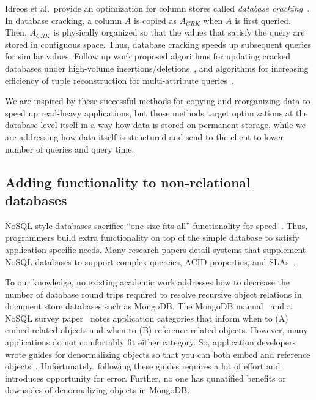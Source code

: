 Idreos et al.~provide an optimization for column stores called {\em database cracking}~\cite{Pirk2007}.
In database cracking, a column $A$ is copied as $A_{CRK}$ when $A$ is first queried.
Then, $A_{CRK}$ is physically organized so that the values that satisfy the query are stored in contiguous space.
Thus, database cracking speeds up subsequent queries for similar values.
Follow up work proposed algorithms for updating cracked databases under high-volume insertions/deletions~\cite{Idreos2007}, and algorithms for increasing efficiency of tuple reconstruction for multi-attribute queries~\cite{Idreos2009}.

We are inspired by these successful methods for copying and reorganizing data to speed up read-heavy applications, but those methods target optimizations at the database level itself in a way how data is stored on permanent storage, while we are addressing how data itself is structured and send to the client to lower number of queries and query time.

\subsection{Adding functionality to non-relational databases} 

NoSQL-style databases sacrifice ``one-size-fits-all'' functionality for speed~\cite{Strauch}.
Thus, programmers build extra functionality on top of the simple database to satisfy application-specific needs.
Many research papers detail systems that supplement NoSQL databases to support complex quereies, ACID properties, and SLAs~\cite{Decandia2007,Chang,Beaver2010,Baker}. 

To our knowledge, no existing academic work addresses how to decrease the number of database round trips required to resolve recursive object relations in document store databases such as MongoDB.
The MongoDB manual~\cite{MongoDB2014} and a NoSQL survey paper~\cite{Strauch} notes application categories that inform when to (A) embed related objects and when to (B) reference related objects.
However, many applications do not comfortably fit either category.
So, application developers wrote guides for denormalizing objects so that you can both embed and reference objects~\cite{Wanschik2010}.
Unfortunately, following these guides requires a lot of effort and introduces opportunity for error.
Further, no one has qunatified benefits or downsides of denormalizing objects in MongoDB.


